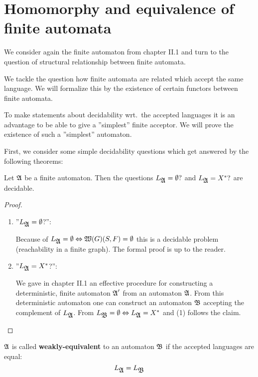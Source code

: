 \section{Homomorphy and equivalence of finite automata}

We consider again the finite automaton from chapter II.1 and turn to the
question of structural relationship between finite automata.

We tackle the question how finite automata are related which accept the same
language. We will formalize this by the existence of certain functors between
finite automata.

To make statements about decidability wrt.\ the accepted languages
it is an advantage to be able to give a ''simplest'' finite acceptor. We will
prove the existence of such a ''simplest'' automaton.

First, we consider some simple decidability questions which get answered by the
following theorems:

\begin{theorem}
Let $\mbox{$\mathfrak{A}$}$ be a finite automaton. Then the questions $L_{\mbox{$\mathfrak{A}$}} = \emptyset?$
and $L_{\mbox{$\mathfrak{A}$}} = X^*?$ are decidable.
\end{theorem}

\begin{proof}\leavevmode
\begin{enumerate}
  \item ''$L_{\mbox{$\mathfrak{A}$}} = \emptyset$?'':

	Because of $L_{\mbox{$\mathfrak{A}$}} = \emptyset \Leftrightarrow \mbox{$\mathfrak{W}({G})$}(S, F) =
	\emptyset$ this is a decidable problem (reachability in a finite graph). The
	formal proof is up to the reader.

	\item ''$L_{\mbox{$\mathfrak{A}$}} = X^*$?'':

	We gave in chapter II.1 an effective procedure for constructing a
	deterministic, finite automaton $\mbox{$\mathfrak{A}$}'$ from an automaton $\mbox{$\mathfrak{A}$}$.	 From
	this deterministic automaton one can construct an automaton $\mbox{$\mathfrak{B}$}$  accepting
	the complement of $L_{\mbox{$\mathfrak{A}$}}$. From $L_{\mbox{$\mathfrak{B}$}} = \emptyset \Leftrightarrow 
	L_{\mbox{$\mathfrak{A}$}} = X^*$ and (1) follows the claim.
\end{enumerate}
\end{proof}

\begin{definition}
$\mbox{$\mathfrak{A}$}$ is called {\bf weakly-equivalent} to an automaton $\mbox{$\mathfrak{B}$}$ if the
accepted languages are equal: \[ L_{\mbox{$\mathfrak{A}$}} = L_{\mbox{$\mathfrak{B}$}} \]
\end{definition}


